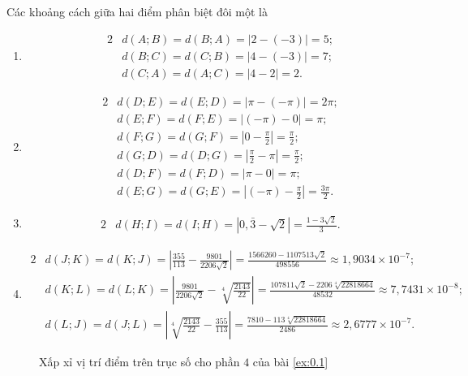 \documentclass[a4paper, titlepage, openany]{book}
\begin{document}
Các khoảng cách giữa hai điểm phân biệt đôi một là
\begin{enumerate}
   \item \begin{alignat*}{2}
      &d(A;B) = d(B;A) = \left|2 - (-3)\right| = 5; \\
      &d(B;C) = d(C;B) = \left|4 - (-3)\right| = 7; \\
      &d(C;A) = d(A;C) = \left|4 - 2\right| = 2.
   \end{alignat*}
   \item \begin{alignat*}{2}
      &d(D;E) = d(E;D) = \left|\pi - (-\pi)\right| = 2\pi; \\
      &d(E;F) = d(F;E) = \left|(-\pi) - 0\right| = \pi; \\
      &d(F;G) = d(G;F) = \left|0 - \frac{\pi}{2}\right| = \frac{\pi}{2}; \\
      &d(G;D) = d(D;G) = \left|\frac{\pi}{2} - \pi\right| = \frac{\pi}{2}; \\
      &d(D;F) = d(F;D) = \left|\pi - 0\right| = \pi;\\
      &d(E;G) = d(G;E) = \left|(-\pi) - \frac{\pi}{2}\right| = \frac{3\pi}{2}.
   \end{alignat*}
   \item \begin{alignat*}{2}
      &d(H;I) = d(I;H) = \left|0{,}\bar{3} - \sqrt{2}\right| = \frac{1-3\sqrt{2}}{3}.
   \end{alignat*}
   \item \begin{alignat*}{2}
      &d(J;K) = d(K;J) = \left|\frac{355}{113} - \frac{9801}{2206\sqrt{2}}\right| = \frac{1566260-1107513\sqrt{2}}{498556} \approx 1{,}9034\times 10^{-7}; \\
      &d(K;L) = d(L;K) = \left|\frac{9801}{2206\sqrt{2}} - \sqrt[4]{\frac{2143}{22}}\right| = \frac{107811\sqrt{2}-2206\sqrt[4]{22818664}}{48532} \approx 7{,}7431\times 10^{-8}; \\
      &d(L;J) = d(J;L) = \left|\sqrt[4]{\frac{2143}{22}} - \frac{355}{113}\right| = \frac{7810-113\sqrt[4]{22818664}}{2486} \approx 2{,}6777\times 10^{-7}.
   \end{alignat*}
\end{enumerate}

\begin{figure}[h]
   \centering
   \caption{Xấp xỉ vị trí điểm trên trục số cho phần $4$ của bài \ref{ex:0.1}}
   \label{fig:truc bon xx}
\end{figure}
\end{document}
